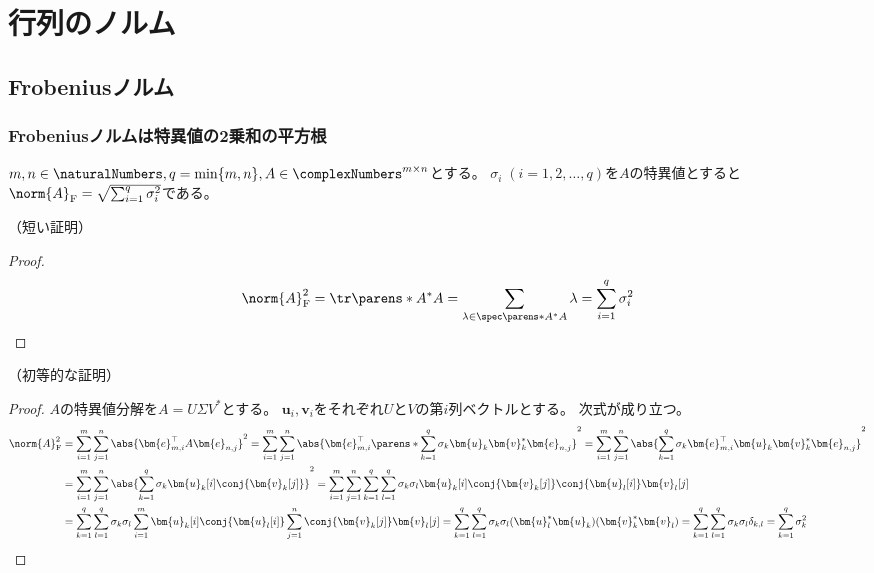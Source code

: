 \chapter{行列のノルム}
    \section{Frobeniusノルム}
        \subsection{Frobeniusノルムは特異値の2乗和の平方根}
            \begin{shadebox}
                $m,n\in\naturalNumbers,q=\min\{m,n\},A\in\complexNumbers^{m\times n}$とする。
                $\sigma_i\;(i=1,2,\dotsc,q)$を$A$の特異値とすると$\norm{A}_\mathrm{F} = \sqrt{\sum_{i=1}^q \sigma_i^2}$である。
            \end{shadebox}
            \noindent
            （短い証明）
            \begin{proof}
                \[ \norm{A}_\mathrm{F}^2=\tr\parens*{A^*A}=\sum_{\lambda\in\spec\parens*{A^*A}}\lambda=\sum_{i=1}^q\sigma_i^2 \]
            \end{proof}
            \noindent
            （初等的な証明）
            \begin{proof}
                $A$の特異値分解を$A=U\Sigma V^*$とする。
                $\bm{u}_i,\bm{v}_i$をそれぞれ$U$と$V$の第$i$列ベクトルとする。
                次式が成り立つ。
                \begin{align*}
                    \norm{A}_\mathrm{F}^2 &= \sum_{i=1}^m \sum_{j=1}^n \abs{\bm{e}_{m,i}^\top A \bm{e}_{n,j}}^2 = \sum_{i=1}^m \sum_{j=1}^n \abs{\bm{e}_{m,i}^\top \parens*{\sum_{k=1}^q \sigma_k \bm{u}_k \bm{v}_k^*} \bm{e}_{n,j}}^2 = \sum_{i=1}^m \sum_{j=1}^n \abs{\sum_{k=1}^q \sigma_k \bm{e}_{m,i}^\top \bm{u}_k \bm{v}_k^* \bm{e}_{n,j}}^2 \\
                    &= \sum_{i=1}^m \sum_{j=1}^n \abs{\sum_{k=1}^q \sigma_k \bm{u}_k[i]\conj{\bm{v}_k[j]}}^2 = \sum_{i=1}^m \sum_{j=1}^n \sum_{k=1}^q \sum_{l=1}^q \sigma_k \sigma_l \bm{u}_k[i]\conj{\bm{v}_k[j]}\conj{\bm{u}_l[i]}\bm{v}_l[j] \\
                    &= \sum_{k=1}^q \sum_{l=1}^q \sigma_k \sigma_l \sum_{i=1}^m \bm{u}_k[i]\conj{\bm{u}_l[i]} \sum_{j=1}^n \conj{\bm{v}_k[j]}\bm{v}_l[j] = \sum_{k=1}^q \sum_{l=1}^q \sigma_k \sigma_l (\bm{u}_l^* \bm{u}_k) (\bm{v}_k^* \bm{v}_l) = \sum_{k=1}^q \sum_{l=1}^q \sigma_k \sigma_l \delta_{k,l} = \sum_{k=1}^q \sigma_k^2
                \end{align*}
            \end{proof}
